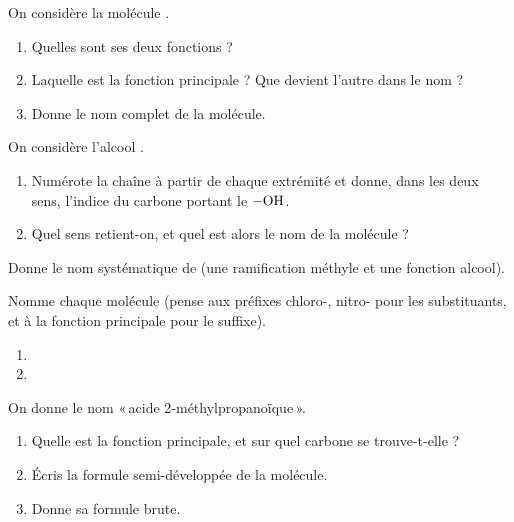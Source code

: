 \documentclass[11pt,a4paper]{article}
\begin{document}
\begin{exo}
On considère la molécule .
\begin{enumerate}[label=\alph*)]
  \item Quelles sont ses deux fonctions ?
  \item Laquelle est la fonction principale ? Que devient l'autre dans le nom ?
  \item Donne le nom complet de la molécule.
\end{enumerate}
\end{exo}

\begin{exo}
On considère l'alcool .
\begin{enumerate}[label=\alph*)]
  \item Numérote la chaîne à partir de chaque extrémité et donne, dans les deux sens, l'indice du carbone portant le $-\ce{OH}$.
  \item Quel sens retient-on, et quel est alors le nom de la molécule ?
\end{enumerate}
\end{exo}

\begin{exo}
Donne le nom systématique de  (une ramification méthyle et une fonction alcool).
\end{exo}

\begin{exo}
Nomme chaque molécule (pense aux préfixes chloro-, nitro- pour les substituants, et à la fonction principale pour le suffixe).
\begin{enumerate}[label=\alph*)]
  \item {}
  \item {}
\end{enumerate}
\end{exo}

\begin{exo}
On donne le nom «\,acide 2-méthylpropanoïque\,».
\begin{enumerate}[label=\alph*)]
  \item Quelle est la fonction principale, et sur quel carbone se trouve-t-elle ?
  \item Écris la formule semi-développée de la molécule.
  \item Donne sa formule brute.
\end{enumerate}
\end{exo}
\end{document}
